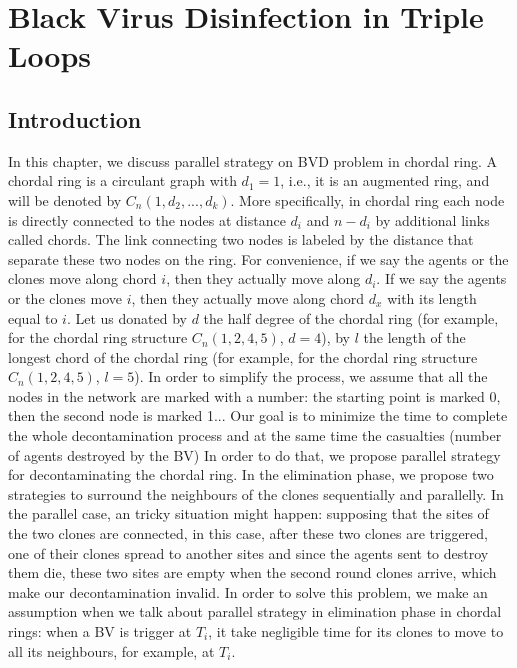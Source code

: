 


\chapter {Black Virus Disinfection in Triple Loops}
\label{TL}
 

\section{Introduction}
In this chapter, we discuss parallel strategy on BVD problem in chordal ring. A chordal ring is a circulant graph with $d_1=1$, i.e., it is an augmented ring, and will be denoted by $C_n(1, d_2, ..., d_k)$. More specifically, in chordal ring each node is directly connected to the nodes at distance $d_i$ and $n-d_i$ by additional links called chords. The link connecting two nodes is labeled by the distance that separate these two nodes on the ring. 
For convenience, if we say the agents or the clones move along chord $i$, then they actually move along $d_i$. If we say the agents or the clones move $i$, then they actually move along chord $d_x$ with its length equal to $i$. Let us donated by $d$ the half degree of the chordal ring (for example, for the chordal ring structure $C_n(1,2,4,5)$, $d=4$), by $l$ the length of the longest chord of the chordal ring (for example, for the chordal ring structure $C_n(1,2,4,5)$, $l=5$). In order to simplify the process, we assume that all the nodes in the network are marked with a number: the starting point is marked 0, then the second node is marked 1... Our goal is to minimize the time to complete the whole decontamination process and at the same time the casualties (number of agents destroyed by the BV) In order to do that, we propose parallel strategy for decontaminating the chordal ring.
In the elimination phase, we propose two strategies to surround the neighbours of the clones sequentially and parallelly. In the parallel case, an tricky situation might happen: supposing that the sites of the two clones are connected, in this case, after these two clones are triggered, one of their clones spread to another sites and since the agents sent to destroy them die, these two sites are empty when the second round clones arrive, which make our decontamination invalid. In order to solve this problem, we make an assumption when we talk about parallel strategy in elimination phase in chordal rings: when a BV is trigger at $T_i$, it take negligible time for its clones to move to all its neighbours, for example, at $T_i$. 

